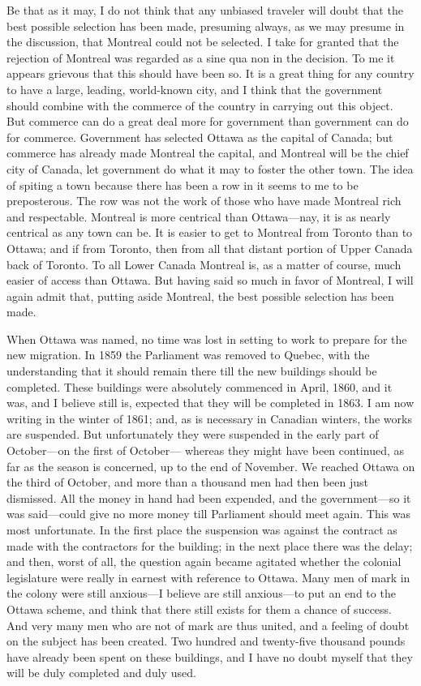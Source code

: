 Be that as it may, I do not think that any unbiased traveler will
doubt that the best possible selection has been made, presuming
always, as we may presume in the discussion, that Montreal could
not be selected.  I take for granted that the rejection of Montreal
was regarded as a sine qua non in the decision.  To me it appears
grievous that this should have been so.  It is a great thing for
any country to have a large, leading, world-known city, and I think
that the government should combine with the commerce of the country
in carrying out this object.  But commerce can do a great deal more
for government than government can do for commerce.  Government has
selected Ottawa as the capital of Canada; but commerce has already
made Montreal the capital, and Montreal will be the chief city of
Canada, let government do what it may to foster the other town.
The idea of spiting a town because there has been a row in it seems
to me to be preposterous.  The row was not the work of those who
have made Montreal rich and respectable.  Montreal is more
centrical than Ottawa---nay, it is as nearly centrical as any town
can be.  It is easier to get to Montreal from Toronto than to
Ottawa; and if from Toronto, then from all that distant portion of
Upper Canada back of Toronto.  To all Lower Canada Montreal is, as
a matter of course, much easier of access than Ottawa.  But having
said so much in favor of Montreal, I will again admit that, putting
aside Montreal, the best possible selection has been made.

When Ottawa was named, no time was lost in setting to work to
prepare for the new migration.  In 1859 the Parliament was removed
to Quebec, with the understanding that it should remain there till
the new buildings should be completed.  These buildings were
absolutely commenced in April, 1860, and it was, and I believe
still is, expected that they will be completed in 1863.  I am now
writing in the winter of 1861; and, as is necessary in Canadian
winters, the works are suspended.  But unfortunately they were
suspended in the early part of October---on the first of October---%
whereas they might have been continued, as far as the season is
concerned, up to the end of November.  We reached Ottawa on the
third of October, and more than a thousand men had then been just
dismissed.  All the money in hand had been expended, and the
government---so it was said---could give no more money till
Parliament should meet again.  This was most unfortunate.  In the
first place the suspension was against the contract as made with
the contractors for the building; in the next place there was the
delay; and then, worst of all, the question again became agitated
whether the colonial legislature were really in earnest with
reference to Ottawa.  Many men of mark in the colony were still
anxious---I believe are still anxious---to put an end to the Ottawa
scheme, and think that there still exists for them a chance of
success.  And very many men who are not of mark are thus united,
and a feeling of doubt on the subject has been created.  Two
hundred and twenty-five thousand pounds have already been spent on
these buildings, and I have no doubt myself that they will be duly
completed and duly used.

